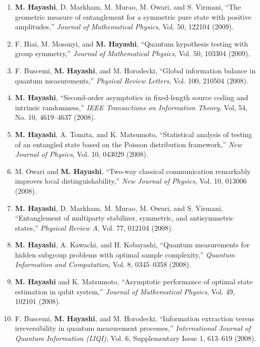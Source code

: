 \documentclass[a4paper,12pt,oneside]{article}
\begin{document}
\begin{enumerate}
\item   \textbf{M. Hayashi}, D. Markham, M. Murao, M. Owari, and S. Virmani, 
``The geometric measure of entanglement for a symmetric pure state with positive amplitudes,'' 
{\em Journal of Mathematical Physics}, Vol. 50, 122104 (2009). 

\item   F. Hiai, M. Mosonyi, and \textbf{M. Hayashi}, 
``Quantum hypothesis testing with group symmetry,''
{\em Journal of Mathematical Physics}, Vol. 50, 103304 (2009).

\item   F. Buscemi, \textbf{M. Hayashi}, and M. Horodecki, 
``Global information balance in quantum measurements,'' 
{\em Physical Review Letters}, Vol. 100, 210504 (2008).

\item   \textbf{M. Hayashi}, 
``Second-order asymptotics in fixed-length source coding and intrinsic randomness,'' 
{\em IEEE Transactions on Information Theory}, Vol, 54, No. 10, 4619--4637 (2008). 

\item   \textbf{M. Hayashi}, A. Tomita, and K. Matsumoto, 
``Statistical analysis of testing of an entangled state based on the Poisson distribution framework,'' 
{\em New Journal of Physics}, Vol. 10, 043029 (2008).

\item   M. Owari and \textbf{M. Hayashi}, 
``Two-way classical communication remarkably improves local distinguishability,'' 
{\em New Journal of Physics}, Vol. 10, 013006 (2008).

\item  \textbf{M. Hayashi}, D. Markham, M. Murao, M. Owari, and S. Virmani, 
``Entanglement of multiparty stabilizer, symmetric, and antisymmetric states,'' 
{\em Physical Review A}, Vol. 77, 012104 (2008).

\item \textbf{M. Hayashi}, A. Kawachi, and H. Kobayashi, 
``Quantum measurements for hidden subgroup problems with optimal sample complexity,'' 
{\em Quantum Information and Computation}, Vol. 8, 0345--0358 (2008). 

\item   \textbf{M. Hayashi} and K. Matsumoto, 
``Asymptotic performance of optimal state estimation in qubit system,'' 
{\em Journal of Mathematical Physics}, Vol. 49, 102101 (2008).

\item F. Buscemi, \textbf{M. Hayashi}, and M. Horodecki, 
``Information extraction versus irreversibility in quantum measurement processes,''
{\em International Journal of Quantum Information (IJQI)}, 
Vol. 6, Supplementary Issue 1, 613--619 (2008). 


\end{enumerate}
\end{document}
